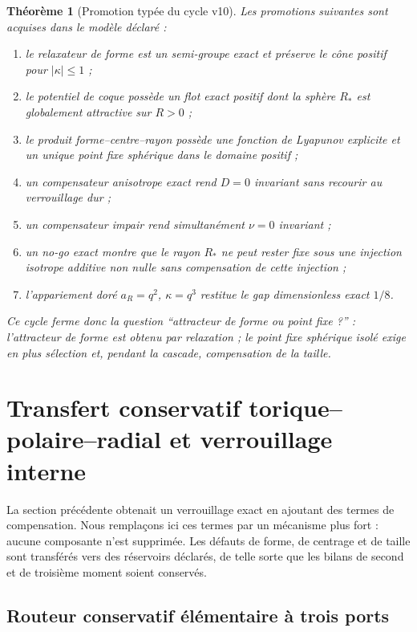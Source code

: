 \documentclass[11pt,a4paper]{article}
\newtheorem{theorem}{Théorème}[section]
\begin{document}
\begin{theorem}[Promotion typée du cycle v10]\label{thm:v10-promotion}
Les promotions suivantes sont acquises dans le modèle déclaré :
\begin{enumerate}[label=\textup{(\roman*)}]
\item le relaxateur de forme est un semi-groupe exact et préserve le cône positif pour $|\kappa|\le1$ ;
\item le potentiel de coque possède un flot exact positif dont la sphère $R_*$ est globalement attractive sur $R>0$ ;
\item le produit forme--centre--rayon possède une fonction de Lyapunov explicite et un unique point fixe sphérique dans le domaine positif ;
\item un compensateur anisotrope exact rend $D=0$ invariant sans recourir au verrouillage dur ;
\item un compensateur impair rend simultanément $\nu=0$ invariant ;
\item un no-go exact montre que le rayon $R_*$ ne peut rester fixe sous une injection isotrope additive non nulle sans compensation de cette injection ;
\item l'appariement doré $a_R=q^2$, $\kappa=q^3$ restitue le gap dimensionless exact $1/8$.
\end{enumerate}
Ce cycle ferme donc la question ``attracteur de forme ou point fixe ?'' : l'attracteur de forme est obtenu par relaxation ; le point fixe sphérique isolé exige en plus sélection et, pendant la cascade, compensation de la taille.
\end{theorem}



\section{Transfert conservatif torique--polaire--radial et verrouillage interne}\label{sec:v11-conservative-transfer}

La section précédente obtenait un verrouillage exact en ajoutant des termes de compensation. Nous remplaçons ici ces termes par un mécanisme plus fort : aucune composante n'est supprimée. Les défauts de forme, de centrage et de taille sont transférés vers des réservoirs déclarés, de telle sorte que les bilans de second et de troisième moment soient conservés.

\subsection{Routeur conservatif élémentaire à trois ports}
\end{document}
